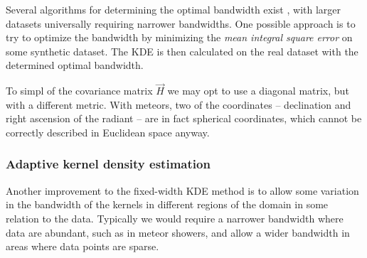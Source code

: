             Several algorithms for determining the optimal bandwidth exist \citep{bowman1985,jones+1996},
            with larger datasets universally requiring narrower bandwidths.
            One possible approach is to try to optimize the bandwidth by minimizing the
            \emph{mean integral square error} on some synthetic dataset.
            The KDE is then calculated on the real dataset with the determined optimal bandwidth.

            To simpl of the covariance matrix $\vec{H}$ we may opt to use a diagonal matrix,
            but with a different metric. With meteors, two of the coordinates -- declination
            and right ascension of the radiant -- are in fact spherical coordinates,
            which cannot be correctly described in Euclidean space anyway.

        \subsubsection{Adaptive kernel density estimation} \label{mmka}
            Another improvement to the fixed-width KDE method is to allow some variation in the bandwidth
            of the kernels in different regions of the domain in some relation to the data.
            Typically we would require a narrower bandwidth where data are abundant,
            such as in meteor showers, and allow a wider bandwidth in areas where data points are sparse.
